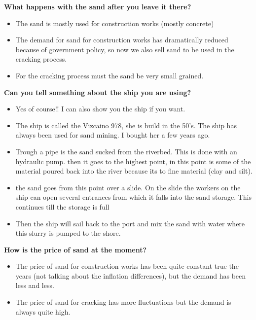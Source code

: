 \textbf{What happens with the sand after you leave it there?}
\begin{itemize}
    \item The sand is mostly used for construction works (mostly concrete)
    \item The demand for sand for construction works has dramatically reduced because of government policy, so now we also sell sand to be used in the cracking process. 
    \item For the cracking process must the sand be very small grained. 
\end{itemize}

\textbf{Can you tell something about the ship you are using?}
\begin{itemize}
    \item Yes of course!! I can also show you the ship if you want. 
    \item The ship is called the Vizcaino 978, she is build in the 50's. The ship has always been used for sand mining. I bought her a few years ago. 
    \item Trough a pipe is the sand sucked from the riverbed. This is done with an hydraulic pump. then it goes to the highest point, in this point is some of the material poured back into the river because its to fine material (clay and silt). 
    \item the sand goes from this point over a slide. On the slide the workers on the ship can open several entrances from which it falls into the sand storage. This continues till the storage is full
    \item Then the ship will sail back to the port and mix the sand with water where this slurry is pumped to the shore. 
\end{itemize}

\textbf{How is the price of sand at the moment?}
\begin{itemize}
    \item The price of sand for construction works has been quite constant true the years (not talking about the inflation differences), but the demand has been less and less.
    \item The price of sand for cracking has more fluctuations but the demand is always quite high.
\end{itemize}